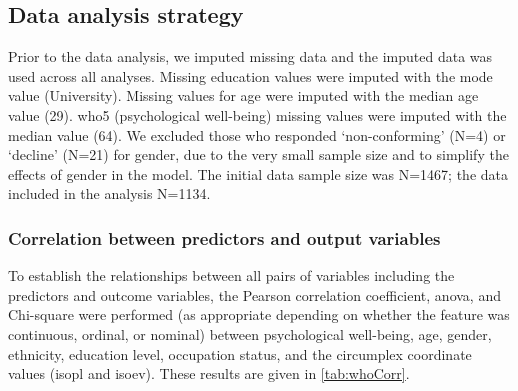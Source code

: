 


\subsection{Data analysis strategy}

Prior to the data analysis, we imputed missing data and the imputed data was used across all analyses. Missing education values were imputed with the mode value (University). Missing values for age were imputed with the median age value (29). \gls{who5} (psychological well-being) missing values were imputed with the median value (64). We excluded those who responded `non-conforming' (N=4) or `decline' (N=21) for gender, due to the very small sample size and to simplify the effects of gender in the model. The initial data sample size was N=1467; the data included in the analysis N=1134.

\subsubsection*{Correlation between predictors and output variables}
To establish the relationships between all pairs of variables including the predictors and outcome variables, the Pearson correlation coefficient, \gls{anova}, and Chi-square were performed (as appropriate depending on whether the feature was continuous, ordinal, or nominal) between psychological well-being, age, gender, ethnicity, education level, occupation status, and the circumplex coordinate values (\gls{isopl} and \gls{isoev}). These results are given in \cref{tab:whoCorr}.

